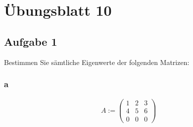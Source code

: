 \chapter{Übungsblatt 10}

\section{Aufgabe 1}

Bestimmen Sie sämtliche Eigenwerte der folgenden Matrizen:

\subsection{a}

\begin{align*}
    A := \begin{pmatrix}
             1 & 2 & 3 \\
             4 & 5 & 6 \\
             0 & 0 & 0
         \end{pmatrix}
\end{align*}

